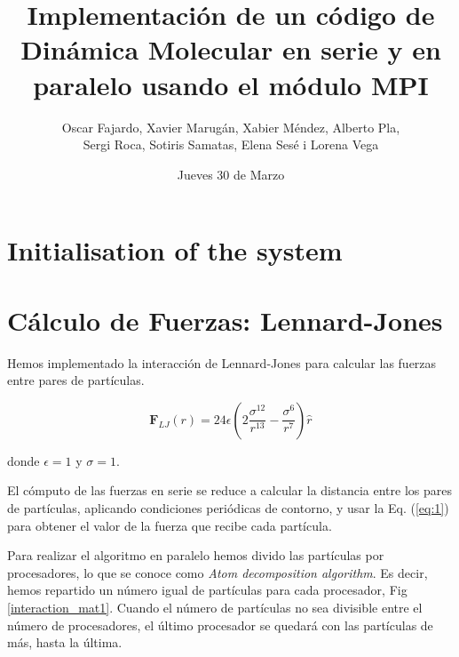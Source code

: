 \documentclass[onecolumn]{article}
\renewcommand{\vec}[1]{\mathbf{#1}}
\begin{document}
\pagestyle{fancy}


\title{Implementación de un código de Dinámica Molecular en serie y en paralelo usando el módulo MPI}
\author{Oscar Fajardo, Xavier Marugán, Xabier Méndez, Alberto Pla,\\ Sergi Roca, Sotiris Samatas, Elena Sesé i Lorena Vega}
\date{Jueves 30 de Marzo}

\maketitle

\section{Initialisation of the system}


\section{Cálculo de Fuerzas: Lennard-Jones}
Hemos implementado la interacción de Lennard-Jones para calcular las fuerzas entre pares de partículas.

\begin{equation} \label{eq:1}
 \vec{F}_{LJ} (r) = 24 \epsilon  \left(2 \frac{{\sigma}^{12}}{r^{13}} -  \frac{{\sigma}^{6}}{r^{7}}\right)\hat{r}
\end{equation}

donde $\epsilon = 1$ y $\sigma = 1$.


El cómputo de las fuerzas en serie se reduce a calcular la distancia entre los pares de partículas, aplicando condiciones periódicas de contorno, y usar la Eq. (\ref{eq:1}) para obtener el valor de la fuerza que recibe cada partícula. 

Para realizar el algoritmo en paralelo hemos divido las partículas por procesadores, lo que se conoce como \textit{Atom decomposition algorithm}. Es decir, hemos repartido un número igual de partículas para cada procesador, Fig \ref{interaction_mat1}. Cuando el número de partículas no sea divisible entre el número de procesadores, el último procesador se quedará con las partículas de más, hasta la última. 
\end{document}
